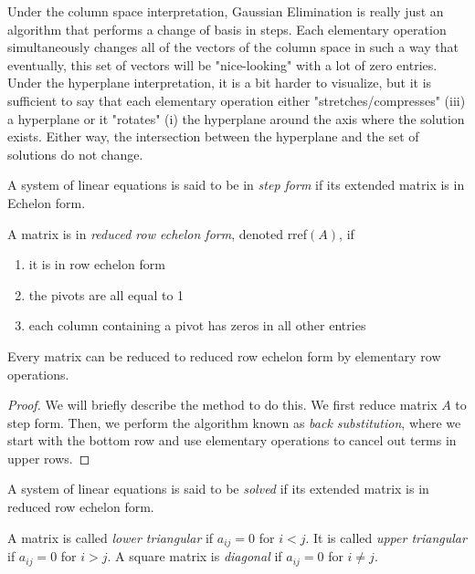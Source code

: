 \documentclass{article}
\begin{document}
    Under the column space interpretation, Gaussian Elimination is really just an algorithm that performs a change of basis in steps. Each elementary operation simultaneously changes all of the vectors of the column space in such a way that eventually, this set of vectors will be "nice-looking" with a lot of zero entries. Under the hyperplane interpretation, it is a bit harder to visualize, but it is sufficient to say that each elementary operation either "stretches/compresses" (iii) a hyperplane or it "rotates" (i) the hyperplane around the axis where the solution exists. Either way, the intersection between the hyperplane and the set of solutions do not change. 

    \begin{definition}
    A system of linear equations is said to be in \textit{step form} if its extended matrix is in Echelon form. 
    \end{definition}

    \begin{definition}
    A matrix is in \textit{reduced row echelon form}, denoted rref$(A)$, if
    \begin{enumerate}
        \item it is in row echelon form
        \item the pivots are all equal to 1
        \item each column containing a pivot has zeros in all other entries
    \end{enumerate}
    \end{definition}

    \begin{theorem}
    Every matrix can be reduced to reduced row echelon form by elementary row operations. 
    \end{theorem}

    \begin{proof}
    We will briefly describe the method to do this. We first reduce matrix $A$ to step form. Then, we perform the algorithm known as \textit{back substitution}, where we start with the bottom row and use elementary operations to cancel out terms in upper rows. 
    \end{proof}

    \begin{definition}
    A system of linear equations is said to be \textit{solved} if its extended matrix is in reduced row echelon form. 
    \end{definition}

    \begin{definition}
    A matrix is called \textit{lower triangular} if $a_{i j} = 0$ for $i < j$. It is called \textit{upper triangular} if $a_{i j} = 0$ for $i > j$. A square matrix is \textit{diagonal} if $a_{i j} = 0$ for $i \neq j$. 
    \end{definition}
\end{document}
